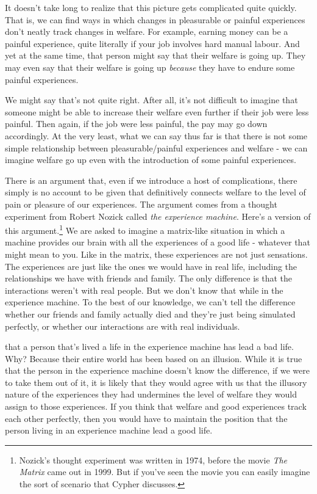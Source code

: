 \documentclass[]{tufte-book}
\begin{document}
It doesn't take long to realize that this picture gets complicated quite quickly. That is, we can find ways in which changes in pleasurable or painful experiences don't neatly track changes in welfare. For example, earning money can be a painful experience, quite literally if your job involves hard manual labour. And yet at the same time, that person might say that their welfare is going up. They may even say that their welfare is going up \emph{because} they have to endure some painful experiences.

We might say that's not quite right. After all, it's not difficult to imagine that someone might be able to increase their welfare even further if their job were less painful. Then again, if the job were less painful, the pay may go down accordingly. At the very least, what we can say thus far is that there is not some simple relationship between pleasurable/painful experiences and welfare - we can imagine welfare go up even with the introduction of some painful experiences.

There is an argument that, even if we introduce a host of complications, there simply is no account to be given that definitively connects welfare to the level of pain or pleasure of our experiences. The argument comes from a thought experiment from Robert Nozick called \emph{the experience machine}. Here's a version of this argument.\footnote{Nozick's thought experiment was written in 1974, before the movie \emph{The Matrix} came out in 1999. But if you've seen the movie you can easily imagine the sort of scenario that Cypher discusses.} We are asked to imagine a matrix-like situation in which a machine provides our brain with all the experiences of a good life - whatever that might mean to you. Like in the matrix, these experiences are not just sensations. The experiences are just like the ones we would have in real life, including the relationships we have with friends and family. The only difference is that the interactions weren't with real people. But we don't know that while in the experience machine. To the best of our knowledge, we can't tell the difference whether our friends and family actually died and they're just being simulated perfectly, or whether our interactions are with real individuals.

 that a person that's lived a life in the experience machine has lead a bad life. Why? Because their entire world has been based on an illusion. While it is true that the person in the experience machine doesn't know the difference, if we were to take them out of it, it is likely that they would agree with us that the illusory nature of the experiences they had undermines the level of welfare they would assign to those experiences. If you think that welfare and good experiences track each other perfectly, then you would have to maintain the position that the person living in an experience machine lead a good life.
\end{document}
